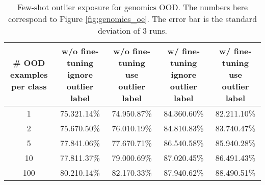 \documentclass{article}
\begin{document}
\begin{table}[h]
\begin{center}	
\caption{Genomics OOD detection using  pre-trained BERT and fine-tuned on the in-distribution training set. The error bars shown are standard deviations over 3 runs.}
\vspace{0.5em}
\vspace{-0.5em}
\label{tab:genomics_full}
\end{center}
\end{table}

\begin{table}[h]
\begin{center}	
\caption{Few-shot outlier exposure for genomics OOD. The numbers here correspond to Figure \ref{fig:genomics_oe}. The error bar is the standard deviation of 3 runs.}
\vspace{0.5em}
\begin{tabular}{ c|c|c|c|c } 
\makecell{\# OOD examples\\ per class} & \makecell{w/o fine-tuning\\ignore outlier label} & \makecell{w/o fine-tuning\\use outlier label} & \makecell{w/ fine-tuning\\ignore outlier label} & \makecell{w/ fine-tuning\\use outlier label} \\ \hline
1 & 75.321.14\% & 74.950.87\% & 84.360.60\% & 82.211.10\% \\
2 & 75.670.50\% & 76.010.19\% & 84.810.83\% & 83.740.47\% \\
5 & 77.841.06\% & 77.670.71\% & 86.540.58\% & 85.940.28\% \\
10 & 77.811.37\% & 79.000.69\% & 87.020.45\% & 86.491.43\% \\
100 & 80.210.14\% & 82.170.33\% & 87.940.62\% & 88.490.51\% \\ \hline
\end{tabular}
\label{tab:genomics_oe}
\end{center}
\end{table}
\end{document}
